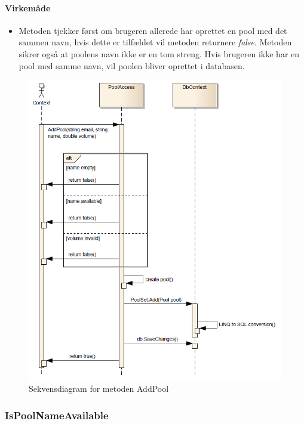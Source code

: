 \paragraph{Virkemåde}
\begin{itemize}
	\item Metoden tjekker først om brugeren allerede har oprettet en pool med det sammen navn, hvis dette er tilfældet vil metoden returnere \textit{false}. Metoden sikrer også at poolens navn ikke er en tom streng. Hvis brugeren ikke har en pool med samme navn, vil poolen bliver oprettet i databasen.
\end{itemize}

\begin{figure}
\centering
\includegraphics[width=\linewidth]{figs/dbSeq/addPool}
\caption{Sekvensdiagram for metoden AddPool}
\label{fig:addPool}
\end{figure}




\subsubsection{IsPoolNameAvailable}%






